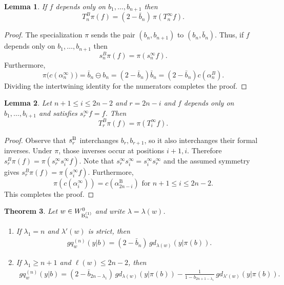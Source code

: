 \documentclass[a4paper]{amsart}
\newtheorem{thm}{Theorem}[section]
\newtheorem{lem}[thm]{Lemma}
\theoremstyle{remark}
\numberwithin{equation}{section}
\begin{document}
\begin{lem}\label{intertwine_n}
    If \(f\) depends only on $b_1,\ldots,b_{n+1}$ then
\[
T_n^B\pi(f)
=
(2-\bar b_n)\,\pi(T_n^\infty f).
\] 
\end{lem}
\begin{proof}
The specialization $\pi$ sends the pair \((b_n,b_{n+1})\) to $(b_n,\bar b_n)$.
Thus, if \(f\) depends only on $b_1,\ldots,b_{n+1}$ then
\[
s_n^B\pi(f)=\pi(s_n^\infty f).
\]
Furthermore,
\[
\pi\bigl(c(\alpha_n^{\infty})\bigr)
=
\bar b_n\ominus b_n
=
(2-\bar b_n)\bar b_n
=
(2-\bar b_n)c(\alpha_n^{B}).
\]
Dividing the intertwining identity for the numerators completes the proof.
\end{proof}


\begin{lem}\label{intertwine_i}
    Let $n+1\le i\le 2n-2$ and
$r=2n-i$ and \(f\) depends only on \(b_1,\ldots,b_{i+1}\) and satisfies
$s_r^\infty f=f$.
Then
\[
T_r^B\pi(f)=\pi(T_i^\infty f).
\]
\end{lem}
\begin{proof}
    Observe that \(s_r^{\mathrm{B}_{}}\) interchanges \(b_r,b_{r+1}\), so it also interchanges their formal inverses. Under \(\pi\), those inverses occur at positions \(i+1,i\). Therefore
$s_r^B\pi(f)=\pi(s_r^\infty s_i^\infty f).$ 
Note that $s_r^\infty s_i^\infty=s_i^\infty s_r^\infty$ and the assumed symmetry gives
$s_r^B\pi(f)
=
\pi(s_i^\infty f).$ Furthermore, $$\pi(c(\alpha_{i}^{\infty}))=c(\alpha_{2n-i}^{\mathrm{B}}) \text{ for } n+1\leq i\leq 2n-2.$$
This completes the proof.
\end{proof}






\begin{thm}\label{thm_sm_cl_b}
Let $w\in W_{\mathrm{B}_{n}^{(1)}}^0$ and write $\lambda=\lambda(w)$.
\begin{enumerate}
    \item If $\lambda_1=n$ and $\lambda'(w)$ is strict, then
    \begin{align}\label{sm_cl_n}
        gq_w^{(n)}(y| b)
        =
        (2-\bar{b}_n)\,gd_{\lambda(w)}(y| \pi(b)).
    \end{align}

    \item If $\lambda_1\geq n+1$ and $\ell(w)\leq 2n-2$, then
    \begin{align}\label{sm_cl_geq_np1}
        gq_w^{(n)}(y| b)
        =
        (2-\bar{b}_{2n-\lambda_1})\,
        gd_{\lambda(w)}(y| \pi(b))
        -
        \frac{1}{1-b_{2n+1-\lambda_1}}\,
        gd_{\lambda'(w)}(y| \pi(b)).
    \end{align}
\end{enumerate}
\end{thm}
\end{document}
